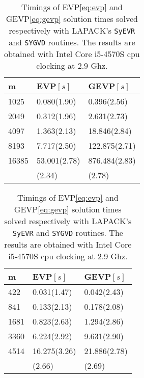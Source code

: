 \documentclass[10pt, a4paper]{article}
\begin{document}
\begin{table}
\begin{subtable}{0.48\textwidth}
  \centering
  \caption{Timings of EVP\eqref{eq:evp} and GEVP\eqref{eq:gevp} solution times solved 
  respectively with LAPACK's \texttt{STEGR} and \texttt{SYGVD} routines. The results 
  are obtained with Intel Core i5-4570S cpu clocking at 2.9 Ghz.}
  \footnotesize{
  \begin{tabular}{l|ll}
  \hline
    m & EVP$\left[s\right]$ & GEVP$\left[s\right]$\\
  \hline
  1025 & 0.080(1.90) & 0.396(2.56)\\
  2049 & 0.312(1.96) & 2.631(2.73)\\
  4097 & 1.363(2.13) & 18.846(2.84)\\
  8193 & 7.717(2.50) & 122.875(2.71)\\
  16385 & 53.001(2.78) & 876.484(2.83)\\
  \hline
      & (2.34) & (2.78)\\
  \hline
  \end{tabular}
  \label{tab:evp_unif}
  }
\end{subtable}
%
\begin{subtable}{0.48\textwidth}
  \centering
  \caption{Timings of EVP\eqref{eq:evp} and GEVP\eqref{eq:gevp} solution times solved 
  respectively with LAPACK's \texttt{SyEVR} and \texttt{SYGVD} routines. The results 
  are obtained with Intel Core i5-4570S cpu clocking at 2.9 Ghz.}
  \footnotesize{
  \begin{tabular}{l|ll}
  \hline
    m & EVP$\left[s\right]$ & GEVP$\left[s\right]$\\
  \hline
  422 & 0.031(1.47) & 0.042(2.43)\\
  841 & 0.133(2.13) & 0.178(2.08)\\
  1681 & 0.823(2.63) & 1.294(2.86)\\
  3360 & 6.224(2.92) & 9.631(2.90)\\
  4514 & 16.275(3.26) & 21.886(2.78)\\
  \hline
    & (2.66) & (2.69)\\
  \hline
  \end{tabular}
  \label{tab:evp_nonunif}
  }
\end{subtable}
\end{table}
\end{document}
